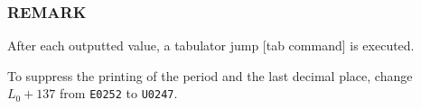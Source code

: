 \subsubsection*{REMARK}
After each outputted value, a tabulator jump [tab command] is executed.

To suppress the printing of the period and the last decimal place, change $L_0+137$ from \texttt{E0252} to \texttt{U0247}.
\newpage